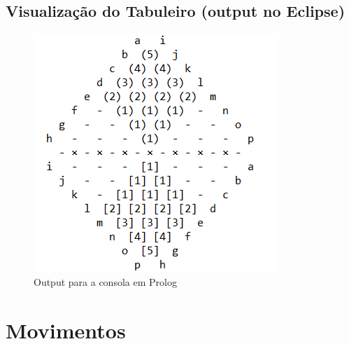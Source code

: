\vspace{1cm}

\subsection{Visualização do Tabuleiro (output no Eclipse)}

\begin{figure}[h!]
\begin{center}
\includegraphics[scale=0.7]{img/output.png}
\caption{Output para a consola em Prolog}
\label{fig:7}
\end{center}
\end{figure}

\newpage

\section{Movimentos}

